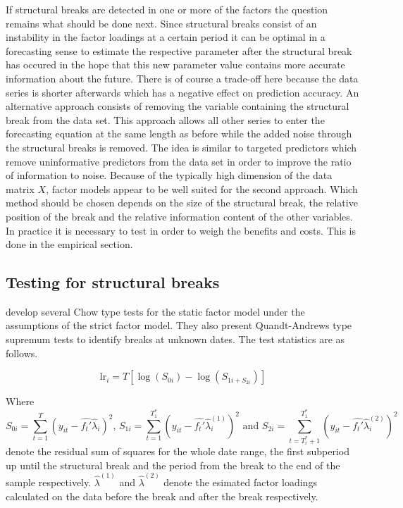 \documentclass[12pt]{article}
\begin{document}
If structural breaks are detected in one or more of the factors the question remains what should be done next. Since structural breaks consist of an instability in the factor loadings at a certain period it can be optimal in a forecasting sense to estimate the respective parameter after the structural break has occured in the hope that this new parameter value contains more accurate information about the future. There is of course a trade-off here because the data series is shorter afterwards which has a negative effect on prediction accuracy.
An alternative approach consists of removing the variable containing the structural break from the data set. This approach allows all other series to enter the forecasting equation at the same length as before while the added noise through the structural breaks is removed. The idea is similar to targeted predictors which remove uninformative predictors from the data set in order to improve the ratio of information to noise. Because of the typically high dimension of the data matrix $X$, factor models appear to be well suited for the second approach. Which method should be chosen depends on the size of the structural break, the relative position of the break and the relative information content of the other variables. In practice it is necessary to test in order to weigh the benefits and costs. This is done in the empirical section.

\subsection{Testing for structural breaks}
\citet{breitung2011testing} develop several Chow type tests for the static factor model under the assumptions of the strict factor model. They also present Quandt-Andrews type supremum tests to identify breaks at unknown dates. The test statistics are as follows.


\begin{equation}
	\label{LR-Statistic}
	\text{lr}_i = T [ \log(S_{0i}) - \log(S_{1i + S_{2i}}) ]
\end{equation}

Where $$S_{0i} = \sum_{t=1}^{T}(y_{it} - \hat{f_t'} \hat \lambda_i)^2 \text{, } S_{1i} = \sum_{t=1}^{T_1^*}(y_{it} - \hat{f_t'} \hat \lambda_i^{(1)})^2 \text{ and } S_{2i} = \sum_{t=T^*_i+1}^{T_1^*}(y_{it} - \hat{f_t'} \hat \lambda_i^{(2)})^2 $$
denote the residual sum of squares for the whole date range, the first subperiod up until the structural break and the period from the break to the end of the sample respectively.
$\hat \lambda^{(1)}$ and $\hat \lambda^{(2)}$ denote the esimated factor loadings calculated on the data before the break and after the break respectively.
\end{document}

